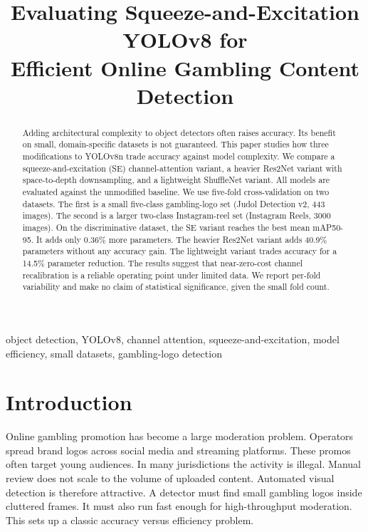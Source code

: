 \documentclass[conference,a4paper]{IEEEtran}
\begin{document}
\title{Evaluating Squeeze-and-Excitation YOLOv8 for\\
Efficient Online Gambling Content Detection}

\author{
}

\maketitle

\begin{abstract}
Adding architectural complexity to object detectors often raises accuracy.
Its benefit on small, domain-specific datasets is not guaranteed. This
paper studies how three modifications to YOLOv8n trade accuracy against
model complexity. We compare a squeeze-and-excitation (SE) channel-attention
variant, a heavier Res2Net variant with space-to-depth downsampling, and a
lightweight ShuffleNet variant. All models are evaluated against the
unmodified baseline. We use five-fold cross-validation on two datasets. The
first is a small five-class gambling-logo set (Judol Detection v2, 443 images). The second
is a larger two-class Instagram-reel set (Instagram Reels, 3000 images). On the
discriminative dataset, the SE variant reaches the best mean mAP50-95. It
adds only 0.36\% more parameters. The heavier Res2Net variant adds 40.9\%
parameters without any accuracy gain. The lightweight variant trades
accuracy for a 14.5\% parameter reduction. The results suggest that
near-zero-cost channel recalibration is a reliable operating point under
limited data. We report per-fold variability and make no claim of
statistical significance, given the small fold count.
\end{abstract}

\begin{IEEEkeywords}
object detection, YOLOv8, channel attention, squeeze-and-excitation,
model efficiency, small datasets, gambling-logo detection
\end{IEEEkeywords}

\section{Introduction}
Online gambling promotion has become a large moderation problem. Operators
spread brand logos across social media and streaming platforms. These promos
often target young audiences. In many jurisdictions the activity is illegal.
Manual review does not scale to the volume of uploaded content. Automated
visual detection is therefore attractive. A detector must find small gambling
logos inside cluttered frames. It must also run fast enough for high-throughput
moderation. This sets up a classic accuracy versus efficiency problem.
\end{document}
